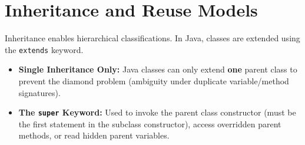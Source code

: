 \documentclass[12pt,a4paper]{article}
\begin{document}
\section{Inheritance and Reuse Models}

Inheritance enables hierarchical classifications. In Java, classes are extended using the \texttt{extends} keyword.

\begin{tcolorbox}[defbox, title={\textbf{Inheritance Characteristics}}]
\begin{itemize}[leftmargin=*, itemsep=3pt]
  \item \textbf{Single Inheritance Only:} Java classes can only extend \textbf{one} parent class to prevent the diamond problem (ambiguity under duplicate variable/method signatures).
  \item \textbf{The \texttt{super} Keyword:} Used to invoke the parent class constructor (must be the first statement in the subclass constructor), access overridden parent methods, or read hidden parent variables.
\end{itemize}
\end{tcolorbox}
\end{document}
